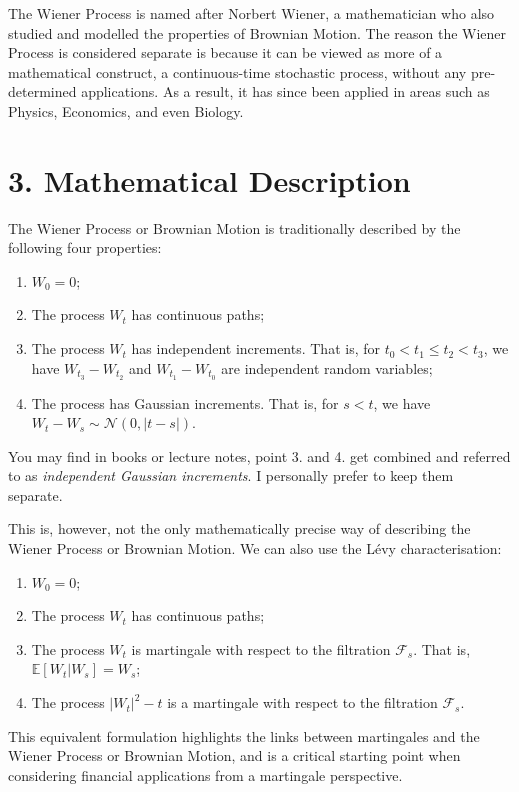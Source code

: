 \documentclass[11pt]{article}
\begin{document}
The Wiener Process is named after Norbert Wiener, a mathematician who also studied and modelled the properties of Brownian Motion. The reason the Wiener Process is considered separate is because it can be viewed as more of a mathematical construct, a continuous-time stochastic process, without any pre-determined applications. As a result, it has since been applied in areas such as Physics, Economics, and even Biology. 

\section*{3. Mathematical Description}
The Wiener Process or Brownian Motion is traditionally described by the following four properties:
\begin{enumerate}
    \item $W_0 = 0$;
     \item The process $W_t$ has continuous paths;
    \item The process $W_t$ has independent increments. That is, for $ t_0 < t_1 \leq t_2 < t_3$, we have $W_{t_3} - W_{t_2}$ and $W_{t_1} - W_{t_0}$ are independent random variables;
    \item The process has Gaussian increments. That is, for $s < t$, we have $W_t - W_s \sim \mathcal{N}(0,|t-s|)$.
\end{enumerate}

You may find in books or lecture notes, point 3. and 4. get combined and referred to as \textit{independent Gaussian increments}. I personally prefer to keep them separate. 

This is, however, not the only mathematically precise way of describing the Wiener Process or Brownian Motion. We can also use the Lévy characterisation:
\begin{enumerate}
    \item $W_0 = 0$;
    \item The process $W_t$ has continuous paths;
    \item The process $W_t$ is martingale with respect to the filtration $\mathcal{F}_s$. That is, $\mathbb{E}[W_t|W_s] = W_s$;
    \item The process $|W_t|^2 - t$ is a martingale with respect to the filtration $\mathcal{F}_s$.
\end{enumerate}

This equivalent formulation highlights the links between martingales and the Wiener Process or Brownian Motion, and is a critical starting point when considering financial applications from a martingale perspective.
\end{document}
